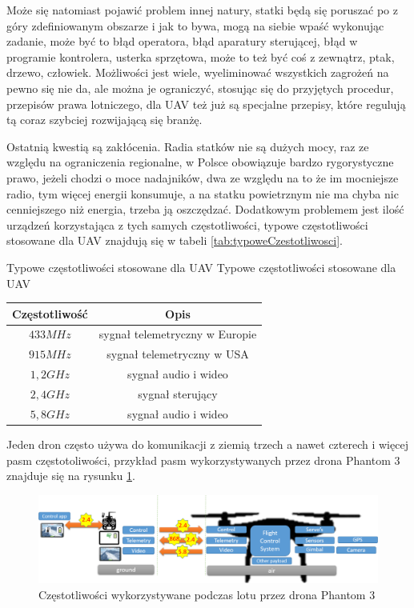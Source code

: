 Może się natomiast pojawić problem innej natury, statki będą się poruszać po z góry zdefiniowanym obszarze i jak to bywa, mogą na siebie wpaść wykonując zadanie, może być to błąd operatora, błąd aparatury sterującej, błąd w programie kontrolera, usterka sprzętowa, może to też być coś z zewnątrz, ptak, drzewo, człowiek. Możliwości jest wiele, wyeliminować wszystkich zagrożeń na pewno się nie da, ale można je ograniczyć, stosując się do przyjętych procedur, przepisów prawa lotniczego, dla UAV też już są specjalne przepisy, które regulują tą coraz szybciej rozwijającą się branżę.

Ostatnią kwestią są zakłócenia. Radia statków nie są dużych mocy, raz ze względu na ograniczenia regionalne, w Polsce obowiązuje bardzo rygorystyczne prawo, jeżeli chodzi o moce nadajników, dwa ze względu na to że im mocniejsze radio, tym więcej energii konsumuje, a na statku powietrznym nie ma chyba nic cenniejszego niż energia, trzeba ją oszczędzać. Dodatkowym problemem jest ilość urządzeń korzystająca z tych samych częstotliwości, typowe częstotliwości stosowane dla UAV znajdują się w tabeli \ref{tab:typoweCzestotliwosci}.
\begin{tablica}
    {Typowe częstotliwości stosowane dla UAV}
    {Typowe częstotliwości stosowane dla UAV}
    {
    \begin{tabular}{|c|c|} \hline
        Częstotliwość & Opis \\ \hline
        $433 MHz$  & sygnał telemetryczny w Europie \\ \hline
        $915 MHz$  & sygnał telemetryczny w USA \\ \hline
        $1,2 GHz$  & sygnał audio i wideo \\ \hline
        $2,4 GHz$  & sygnał sterujący \\ \hline
        $5,8 GHz$  & sygnał audio i wideo \\ \hline
   \end{tabular}
    }
    \label{tab:typoweCzestotliwosci}
\end{tablica}

Jeden dron często używa do komunikacji z ziemią trzech a nawet czterech i więcej pasm częstotoliwości, przykład pasm wykorzystywanych przez drona Phantom 3 znajduje się na rysunku \ref{fig:phantomczestotliwosci}.

\begin{figure}[!th]
    \centering
    \includegraphics[width=15cm]{zalaczniki/obrazy/phantom_czestotliwosci.png}
	\caption{Częstotliwości wykorzystywane podczas lotu przez drona Phantom 3 \cite{radiointerference}}
    \label{fig:phantomczestotliwosci}
\end{figure}


